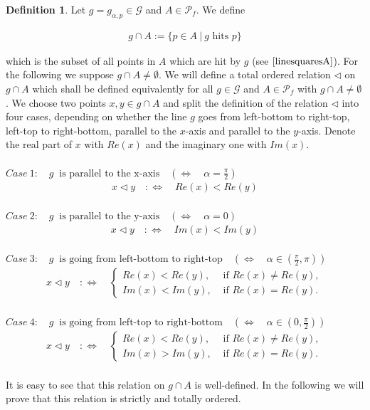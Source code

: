 \documentclass[12pt,a4paper]{scrartcl}
\numberwithin{equation}{subsection}
\newcommand{\1}{\mathbbm{1}}
\newcommand{\G}{\mathcal{G}}
\numberwithin{equation}{section}
\theoremstyle{definition}
\newtheorem{definition}{Definition}[subsection]
\begin{document}
\begin{definition} \label{ghitA}
	Let $g=g_{\alpha,p}\in \G$ and $A\in \mathcal{P}_f$. We define 
	
	\begin{align*}
		g\cap A := \{ p\in A\ |\ g \text{ hits } p\}
	\end{align*}
	
	which is the subset of all points in $A$ which are hit by $g$ (see $\autoref{linesquaresA}$). For the following we suppose $g\cap A \neq \emptyset$. We will define a total ordered relation $\triangleleft$ on $g\cap A$ which shall be defined equivalently for all $g\in \G$ and $A\in\mathcal{P}_f$ with $g\cap A \neq\emptyset$. We choose two points $x,y\in g\cap A$ and split the definition of the relation $\triangleleft$ into four cases, depending on whether the line $g$ goes from left-bottom to right-top, left-top to right-bottom, parallel to the $x$-axis and parallel to the $y$-axis. Denote the real part of $x$ with $Re(x)$ and the imaginary one with $Im(x)$. \\
	\\
	$\mathit{Case}\ 1:\quad g\ \text{ is parallel to the x-axis}\quad (\Leftrightarrow\quad \alpha = \frac{\pi}{2})$
	\begin{align*}
	x \triangleleft y \quad :\Leftrightarrow \quad Re(x) < Re(y)
	\end{align*}\\
	$\mathit{Case}\ 2:\quad g\ \text{ is parallel to the y-axis}\quad (\Leftrightarrow\quad \alpha = 0)$
	\begin{align*}
	x \triangleleft y \quad :\Leftrightarrow \quad Im(x) < Im(y)
	\end{align*}\\
	$\mathit{Case}\ 3:\quad g\ \text{ is going from left-bottom to right-top}\quad (\Leftrightarrow\quad \alpha\in (\frac{\pi}{2},\pi))$
	\begin{align*}
	x \triangleleft y \quad :\Leftrightarrow \quad
		\begin{cases}
			Re(x) < Re(y), & \text{ if } Re(x) \neq Re(y), \\
			Im(x) < Im(y), & \text{ if } Re(x) = Re(y).
		\end{cases}
	\end{align*}\\
	$\mathit{Case}\ 4:\quad g\ \text{ is going from left-top to right-bottom}\quad (\Leftrightarrow\quad \alpha\in (0,\frac{\pi}{2}))$
	\begin{align*}
	x \triangleleft y \quad :\Leftrightarrow \quad
	\begin{cases}
	Re(x) < Re(y), & \text{ if } Re(x) \neq Re(y), \\
	Im(x) > Im(y), & \text{ if } Re(x) = Re(y).
	\end{cases}
	\end{align*}\\
	It is easy to see that this relation on $g\cap A$ is well-defined. In the following we will prove that this relation is strictly and totally ordered. 
\end{definition}
\end{document}
